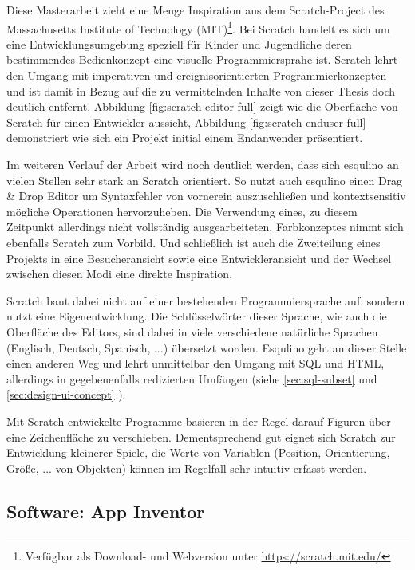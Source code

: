 Diese Masterarbeit zieht eine Menge Inspiration aus dem Scratch-Project des Massachusetts Institute of Technology (MIT)\footnote{Verfügbar als Download- und Webversion unter \url{https://scratch.mit.edu/}}. Bei Scratch handelt es sich um eine Entwicklungsumgebung speziell für Kinder und Jugendliche deren bestimmendes Bedienkonzept eine visuelle Programmiersprahe ist. Scratch lehrt den Umgang mit imperativen und ereignisorientierten Programmierkonzepten und ist damit in Bezug auf die zu vermittelnden Inhalte von dieser Thesis doch deutlich entfernt. Abbildung \ref{fig:scratch-editor-full} zeigt wie die Oberfläche von Scratch für einen Entwickler aussieht, Abbildung \ref{fig:scratch-enduser-full} demonstriert wie sich ein Projekt initial einem Endanwender präsentiert.

Im weiteren Verlauf der Arbeit wird noch deutlich werden, dass sich esqulino an vielen Stellen sehr stark an Scratch orientiert. So nutzt auch esqulino einen Drag \& Drop Editor um Syntaxfehler von vornerein auszuschließen und kontextsensitiv mögliche Operationen hervorzuheben. Die Verwendung eines, zu diesem Zeitpunkt allerdings nicht vollständig ausgearbeiteten, Farbkonzeptes nimmt sich ebenfalls Scratch zum Vorbild. Und schließlich ist auch die Zweiteilung eines Projekts in eine Besucheransicht sowie eine Entwickleransicht und der Wechsel zwischen diesen Modi eine direkte Inspiration.

Scratch baut dabei nicht auf einer bestehenden Programmiersprache auf, sondern nutzt eine Eigenentwicklung. Die Schlüsselwörter dieser Sprache, wie auch die Oberfläche des Editors, sind dabei in viele verschiedene natürliche Sprachen (Englisch, Deutsch, Spanisch, ...) übersetzt worden. Esqulino geht an dieser Stelle einen anderen Weg und lehrt unmittelbar den Umgang mit SQL und HTML, allerdings in gegebenenfalls redizierten Umfängen (siehe \ref{sec:sql-subset}  und \ref{sec:design-ui-concept} ).

Mit Scratch entwickelte Programme basieren in der Regel darauf Figuren über eine Zeichenfläche zu verschieben. Dementsprechend gut eignet sich Scratch zur Entwicklung kleinerer Spiele, die Werte von Variablen (Position, Orientierung, Größe, ... von Objekten) können im Regelfall sehr intuitiv erfasst werden.

\newpage

\subsection{Software: App Inventor}

